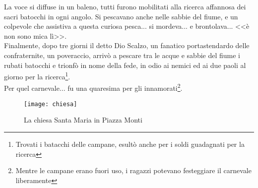\indent La voce si diffuse in un baleno, tutti furono mobilitati alla ricerca affannosa dei sacri batocchi in ogni angolo. Si pescavano anche nelle sabbie del fiume, e un colpevole che assistiva a questa curiosa pesca... si mordeva... e brontolava... <<è non sono mica lì>>.\\
\indent Finalmente, dopo tre giorni il detto Dio Scalzo, un fanatico portastendardo delle confraternite, un poveraccio, arrivò a pescare tra le acque e sabbie del fiume i rubati batocchi e trionfò in nome della fede, in odio ai nemici ed ai due paoli al giorno per la ricerca\footnote{Trovati i batacchi delle campane, esultò anche per i soldi guadagnati per la ricerca}.\\
\indent Per quel carnevale... fu una quaresima per gli innamorati\footnote{Mentre le campane erano fuori uso, i ragazzi potevano festeggiare il carnevale liberamente}.
 \begin{figure}[htb]
    \centering
    \vspace{-0.5cm}
    \texttt{[image: chiesa]}
    \caption*{La chiesa Santa Maria in Piazza Monti\label{fig:chiesa}}
    \vspace{-0.7cm}
\end{figure}






















%